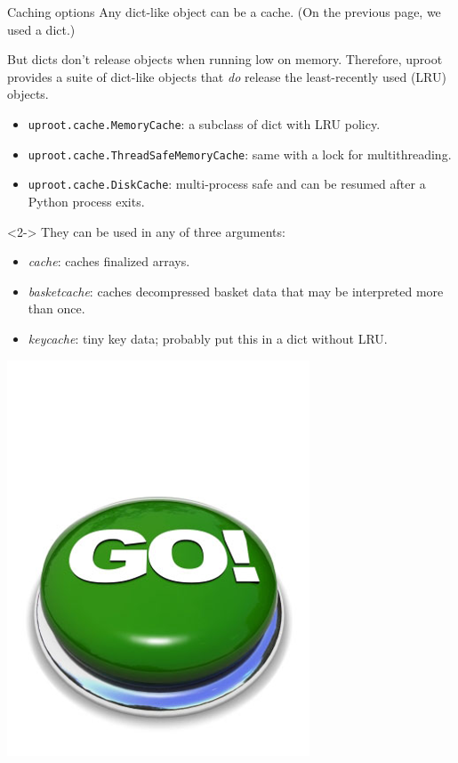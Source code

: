 \documentclass[aspectratio=169]{beamer}
\begin{document}

\begin{frame}{Caching options}
\vspace{0.25 cm}
Any dict-like object can be a cache. (On the previous page, we used a dict.)

\vspace{0.25 cm}
But dicts don't release objects when running low on memory. Therefore, uproot provides a suite of dict-like objects that {\it do} release the least-recently used (LRU) objects.

\vspace{0.25 cm}
\begin{itemize}
\item {\tt\small uproot.cache.MemoryCache}: a subclass of dict with LRU policy.
\item {\tt\small uproot.cache.ThreadSafeMemoryCache}: same with a lock for multithreading.
\item {\tt\small uproot.cache.DiskCache}: multi-process safe and can be resumed after a Python process exits.
\end{itemize}

\begin{uncoverenv}<2->
\vspace{0.25 cm}
They can be used in any of three arguments:

\vspace{0.25 cm}
\begin{itemize}
\item {\it cache}: caches finalized arrays.
\item {\it basketcache}: caches decompressed basket data that may be interpreted more than once.
\item {\it keycache}: tiny key data; probably put this in a dict without LRU.
\end{itemize}
\end{uncoverenv}

\vspace{-7.7 cm}
\hfill \includegraphics[width=1.5 cm]{safe.png}\hspace{-0.9 cm}
\vspace{7.7 cm}
\end{frame}
\end{document}
